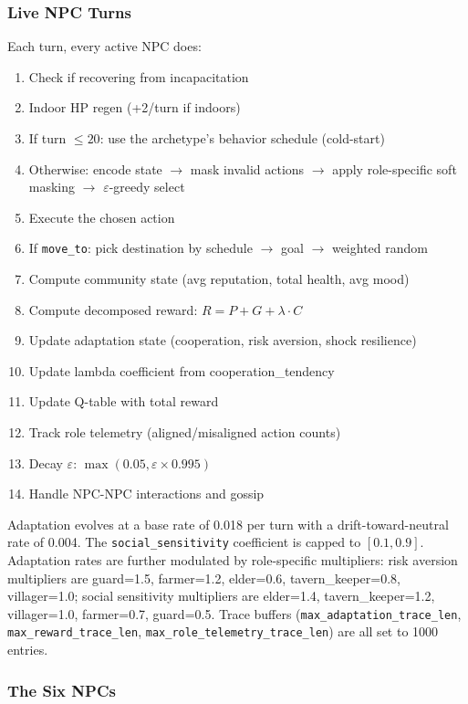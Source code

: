 \subsubsection{Live NPC Turns}

Each turn, every active NPC does:
\begin{enumerate}
    \item Check if recovering from incapacitation
    \item Indoor HP regen (+2/turn if indoors)
    \item If turn $\leq 20$: use the archetype's behavior schedule (cold-start)
    \item Otherwise: encode state $\to$ mask invalid actions $\to$ apply role-specific soft masking $\to$ $\varepsilon$-greedy select
    \item Execute the chosen action
    \item If \texttt{move\_to}: pick destination by schedule $\to$ goal $\to$ weighted random
    \item Compute community state (avg reputation, total health, avg mood)
    \item Compute decomposed reward: $R = P + G + \lambda \cdot C$
    \item Update adaptation state (cooperation, risk aversion, shock resilience)
    \item Update lambda coefficient from cooperation\_tendency
    \item Update Q-table with total reward
    \item Track role telemetry (aligned/misaligned action counts)
    \item Decay $\varepsilon$: $\max(0.05, \varepsilon \times 0.995)$
    \item Handle NPC-NPC interactions and gossip
\end{enumerate}

Adaptation evolves at a base rate of 0.018 per turn with a drift-toward-neutral rate of 0.004. The \texttt{social\_sensitivity} coefficient is capped to $[0.1, 0.9]$. Adaptation rates are further modulated by role-specific multipliers: risk aversion multipliers are guard=1.5, farmer=1.2, elder=0.6, tavern\_keeper=0.8, villager=1.0; social sensitivity multipliers are elder=1.4, tavern\_keeper=1.2, villager=1.0, farmer=0.7, guard=0.5. Trace buffers (\texttt{max\_adaptation\_trace\_len}, \texttt{max\_reward\_trace\_len}, \texttt{max\_role\_telemetry\_trace\_len}) are all set to 1000 entries.

\subsubsection{The Six NPCs}

